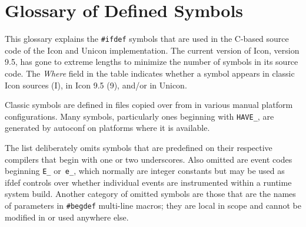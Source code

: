 \chapter{Glossary of Defined Symbols}

This glossary explains the \texttt{\#ifdef} symbols that are used in the
C-based source code of the Icon and Unicon implementation.  The
current version of Icon, version 9.5, has gone to extreme lengths
to minimize the number of symbols in its source code. The {\em Where\/}
field in the table indicates whether a symbol appears in classic Icon
sources (I), in Icon 9.5 (9), and/or in Unicon.

Classic symbols are defined in  files copied over from
 in various manual platform configurations.
Many symbols, particularly ones beginning with \texttt{HAVE\_}, are
generated by autoconf on platforms where it is available.

The list deliberately omits symbols that are predefined on their
respective compilers that begin with one or two underscores. Also
omitted are event codes beginning \texttt{E\_} or\texttt{ e\_}, which normally are
integer constants but may be used as ifdef controls over whether
individual events are instrumented within a runtime system build.
Another category of omitted symbols are those that are the names
of parameters in \texttt{\#begdef} multi-line macros; they are local in
scope and cannot be modified in  or used anywhere else.


\bigskip

